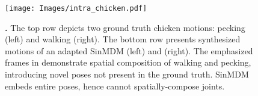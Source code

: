 \begin{figure}
    

    \centering
    
    \texttt{[image: Images/intra\_chicken.pdf]}
    
    \caption{
    \textbf{\Ingen.} The top row depicts two ground truth chicken motions: pecking (left) and walking (right). The bottom row presents synthesized motions of an adapted SinMDM (left) and \algoname (right). The emphasized frames in \algoname demonstrate spatial composition of walking and pecking, introducing novel poses not present in the ground truth. SinMDM embeds entire poses, hence cannot spatially-compose joints. 
    }
    \label{fig:in_gen}
    \Description[]{}  %
\end{figure}
